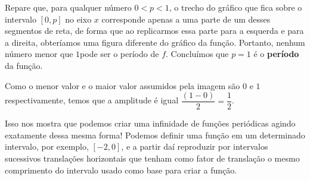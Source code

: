 Repare que, para qualquer número $0 < p < 1$, o trecho do gráfico que fica sobre o intervalo $[0, p]$ no eixo $x$ corresponde apenas a uma parte de um desses segmentos de reta, de forma que ao replicarmos essa parte para a esquerda e para a direita, obteríamos uma figura diferente do gráfico da função. Portanto, nenhum número menor que $1 $pode ser o período de $f$. Concluímos que $p =1$ é o \textbf{período} da função.

Como o menor valor e o maior valor assumidos pela imagem são $0$ e $1$ respectivamente, temos que a amplitude é igual $\dfrac{(1-0)}{2}=\dfrac{1}{2}$.

Isso nos mostra que podemos criar uma infinidade de funções periódicas agindo exatamente dessa mesma forma! Podemos definir uma função em um determinado intervalo, por exemplo, $[-2, 0]$, e a partir daí reproduzir por intervalos sucessivos translações horizontais que tenham como fator de translação o mesmo comprimento do intervalo usado como base para criar a função.

\label{trig-prac1}
\phantom{M}
\vspace{-1em}
\vspace{-\baselineskip}

